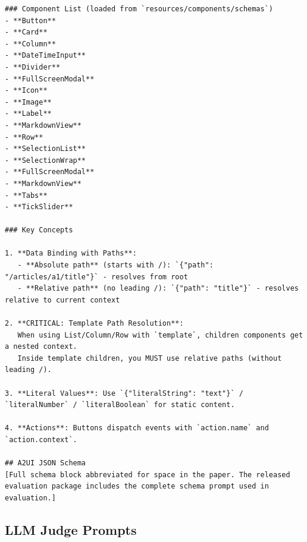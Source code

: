 \begin{verbatim}
### Component List (loaded from `resources/components/schemas`)
- **Button**
- **Card**
- **Column**
- **DateTimeInput**
- **Divider**
- **FullScreenModal**
- **Icon**
- **Image**
- **Label**
- **MarkdownView**
- **Row**
- **SelectionList**
- **SelectionWrap**
- **FullScreenModal**
- **MarkdownView**
- **Tabs**
- **TickSlider**

### Key Concepts

1. **Data Binding with Paths**:
   - **Absolute path** (starts with /): `{"path": "/articles/a1/title"}` - resolves from root
   - **Relative path** (no leading /): `{"path": "title"}` - resolves relative to current context

2. **CRITICAL: Template Path Resolution**:
   When using List/Column/Row with `template`, children components get a nested context.
   Inside template children, you MUST use relative paths (without leading /).

3. **Literal Values**: Use `{"literalString": "text"}` / `literalNumber` / `literalBoolean` for static content.

4. **Actions**: Buttons dispatch events with `action.name` and `action.context`.

## A2UI JSON Schema
[Full schema block abbreviated for space in the paper. The released evaluation package includes the complete schema prompt used in evaluation.]
\end{verbatim}

\subsection{LLM Judge Prompts}
\label{app:a2ui-llm-judge-prompts}

